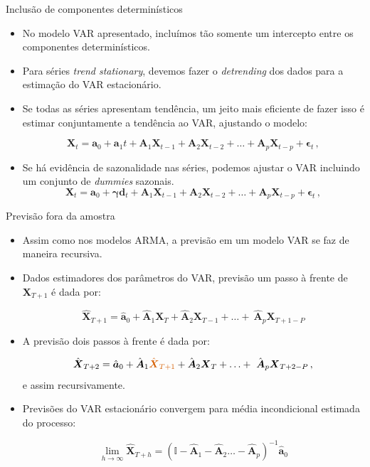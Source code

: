 \documentclass[11pt]{beamer}
\begin{document}
\begin{frame}{Inclusão de componentes determinísticos}
	\begin{itemize}
		\item No modelo VAR apresentado, incluímos tão somente um intercepto entre os componentes determinísticos.
		\item Para  séries \textit{trend stationary}, devemos fazer o \textit{detrending} dos dados para a estimação do VAR estacionário.
		\item Se todas as séries apresentam tendência, um jeito mais eficiente de fazer isso é estimar conjuntamente a tendência ao VAR, ajustando o modelo:
		
			\begin{equation*}
			\boldsymbol{X}_t = \boldsymbol{a}_0 +\boldsymbol{a}_1 t + \boldsymbol{A}_1 \boldsymbol{X}_{t-1} + \boldsymbol{A}_2 \boldsymbol{X}_{t-2} + \ldots + \boldsymbol{A}_p \boldsymbol{X}_{t-p} + \boldsymbol{\epsilon}_t \, ,
		\end{equation*}
		
		\item Se há evidência de sazonalidade nas séries, podemos ajustar o VAR incluindo um conjunto de \textit{dummies} sazonais.
			\begin{equation*}
			\boldsymbol{X}_t = \boldsymbol{a}_0 +\boldsymbol{\gamma} \boldsymbol{d}_t + \boldsymbol{A}_1 \boldsymbol{X}_{t-1} + \boldsymbol{A}_2 \boldsymbol{X}_{t-2} + \ldots + \boldsymbol{A}_p \boldsymbol{X}_{t-p} + \boldsymbol{\epsilon}_t \, ,
		\end{equation*}
	\end{itemize}
\end{frame}

\begin{frame}{Previsão fora da amostra}
	\begin{itemize}
		\item Assim como nos modelos ARMA, a previsão em um modelo VAR se faz de maneira recursiva.
		\item Dados estimadores dos parâmetros do VAR,  previsão um passo à frente de $\boldsymbol{X}_{T+1}$ é dada por:
		
		$$\hat{\boldsymbol{X}}_{T+1} = \hat{\boldsymbol{a}}_0 +  \hat{\boldsymbol{A}}_1 \boldsymbol{X}_{T} + \hat{\boldsymbol{A}}_2 \boldsymbol{X}_{T-1} + \ldots + \ \hat{\boldsymbol{A}}_p \boldsymbol{X}_{T+1-P}  $$
		\item A previsão dois passos à frente é dada por: 
		
		$$\hat{\boldsymbol{X}}_{T+2} = \hat{\boldsymbol{a}}_0 +  \hat{\boldsymbol{A}}_1 {\color{red}\hat{\boldsymbol{X}}_{T+1} }+ \hat{\boldsymbol{A}}_2 \boldsymbol{X}_{T} + \ldots + \ \hat{\boldsymbol{A}}_p \boldsymbol{X}_{T+2-P}  \, ,$$
		e assim recursivamente.
		\item Previsões do VAR estacionário convergem para média incondicional estimada do processo:
		
		$$\lim_{h \to \infty }\hat{\boldsymbol{X}}_{T+h} = (\mathbb{I}-  \hat{\boldsymbol{A}}_1 -  \hat{\boldsymbol{A}}_2 \ldots -  \hat{\boldsymbol{A}}_p )^{-1}\hat{\boldsymbol{a}}_0 $$
	\end{itemize}
\end{frame}
\end{document}

